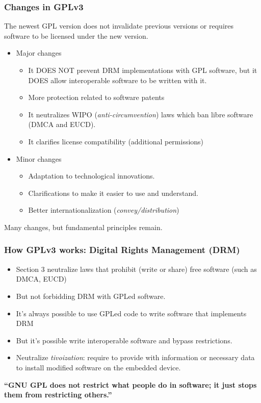 \documentclass{beamer}
\begin{document}
\begin{frame}
\frametitle{Changes in GPLv3}
The newest GPL version does not invalidate previous versions or requires software to be licensed under the new version.
\begin{itemize}
\item Major changes
    \begin{itemize}
        \item It DOES NOT prevent DRM implementations with GPL software, but it DOES allow interoperable software to be written with it.
        \item {More protection related to software patents}
        \item It neutralizes WIPO (\textit{anti-circumvention}) laws which ban libre software (DMCA and EUCD).
        \item It clarifies license compatibility (additional permissions)
    \end{itemize}
\item Minor changes
    \begin{itemize}
        \item Adaptation to technological innovations.
        \item Clarifications to make it easier to use and understand.
        \item Better internationalization (\textit{convey/distribution})
    \end{itemize}
\end{itemize}

\pause

Many changes, but fundamental principles remain.

\end{frame}


\begin{frame}
\frametitle{How GPLv3 works: Digital Rights Management (DRM)}

\begin{itemize}
\item Section 3 neutralize laws that prohibit (write or share) free software (such as DMCA, EUCD)
\item But not forbidding DRM with GPLed software.
\item It's always possible to use GPLed code to write software that implements DRM 
\item But it's possible write interoperable software and bypass restrictions. 
\item Neutralize \textit{tivoization}: require to provide with information or necessary data to install modified software on the embedded device.
\end{itemize}

\textbf{``GNU GPL does not restrict what people do in software; it just stops them from restricting others.''}

\end{frame}
\end{document}
